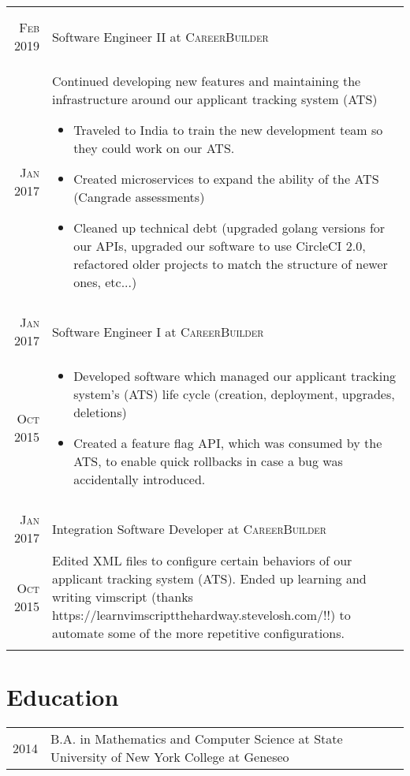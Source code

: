 \documentclass[a4paper,10pt]{article}
\begin{document}
\begin{tabular}{r|p{13cm}}
\begin{itemize}
\begin{itemize}
   \end{itemize}
 \end{itemize}
 \\
 \multicolumn{2}{c}{} \\
 \textsc{Feb 2019} & Software Engineer II at \textsc{CareerBuilder} \\
 \textsc{Jan 2017} &
 \footnotesize{Continued developing new features and maintaining the infrastructure around our applicant tracking system (ATS)}
 \begin{itemize}
   \item \footnotesize{Traveled to India to train the new development team so they could work on our ATS.}
   \item \footnotesize{Created microservices to expand the ability of the ATS (Cangrade assessments)}
   \item \footnotesize{Cleaned up technical debt (upgraded golang versions for our APIs, upgraded our software to use CircleCI 2.0, refactored older projects to match the structure of newer ones, etc...)}
 \end{itemize}
 \\
 \multicolumn{2}{c}{} \\
 \textsc{Jan 2017} & Software Engineer I at \textsc{CareerBuilder} \\
 \textsc{Oct 2015} &
 \begin{itemize}
   \item \footnotesize{Developed software which managed our applicant tracking system's (ATS) life cycle (creation, deployment, upgrades, deletions)}
   \item \footnotesize{Created a feature flag API, which was consumed by the ATS, to enable quick rollbacks in case a bug was accidentally introduced.}
 \end{itemize}
 \\
 \multicolumn{2}{c}{} \\
 \textsc{Jan 2017} & Integration Software Developer at \textsc{CareerBuilder} \\
 \textsc{Oct 2015} &
 \footnotesize{Edited XML files to configure certain behaviors of our applicant tracking system (ATS). Ended up learning and writing vimscript (thanks https://learnvimscriptthehardway.stevelosh.com/!!) to automate some of the more repetitive configurations.}
 \\
 \multicolumn{2}{c}{} \\
\end{tabular}

\section{Education}
\begin{tabular}{rl}	
  \textsc{2014} & B.A. in Mathematics and Computer Science at State University of New York College at Geneseo \\
\end{tabular}
\end{document}
